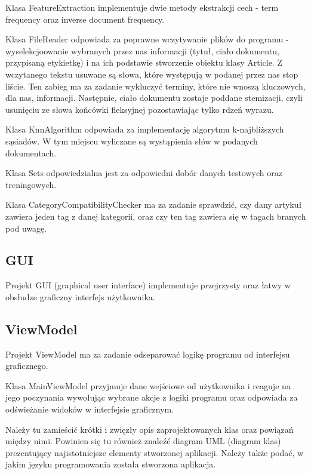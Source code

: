 \documentclass{classrep}
\begin{document}
Klasa FeatureExtraction implementuje dwie metody ekstrakcji cech - term frequency oraz inverse document frequency. \newline

Klasa FileReader odpowiada za poprawne wczytywanie plików do programu - wyselekcjoowanie wybranych przez nas informacji (tytuł, ciało dokumentu, przypisaną etykietkę) i na ich podstawie stworzenie obiektu klasy Article. Z wczytanego tekstu usuwane są słowa, które występują w podanej przez nas stop liście. Ten zabieg ma za zadanie wykluczyć terminy, które nie wnoszą kluczowych, dla nas, informacji. Następnie, ciało dokumentu zostaje poddane stemizacji, czyli usunięciu ze słowa końcówki fleksyjnej pozostawiając tylko rdzeń wyrazu. \newline

Klasa KnnAlgorithm odpowiada za implementację algorytmu k-najbliższych sąsiadów. W tym miejscu wyliczane są wystąpienia słów w podanych dokumentach. \newline

Klasa Sets odpowiedzialna jest za odpowiedni dobór danych testowych oraz treningowych. \newline

Klasa CategoryCompatibilityChecker ma za zadanie sprawdzić, czy dany artykuł zawiera jeden tag z danej kategorii, oraz czy ten tag zawiera się w tagach branych pod uwagę.

\subsection{GUI}
Projekt GUI (graphical user interface) implementuje przejrzysty oraz łatwy w obsłudze graficzny interfejs użytkownika. 

\subsection{ViewModel}
Projekt ViewModel ma za zadanie odseparować logikę programu od interfejsu graficznego. \newline

Klasa MainViewModel przyjmuje dane wejściowe od użytkownika i reaguje na jego poczynania wywołując wybrane akcje z logiki programu oraz odpowiada za odświeżanie widoków w interfejsie graficznym.  



{\color{blue}
Należy tu zamieścić krótki i zwięzły opis zaprojektowanych klas oraz powiązań
między nimi. Powinien się tu również znaleźć diagram UML  (diagram klas)
prezentujący najistotniejsze elementy stworzonej aplikacji. Należy także
podać, w jakim języku programowania została stworzona aplikacja. }
\end{document}

